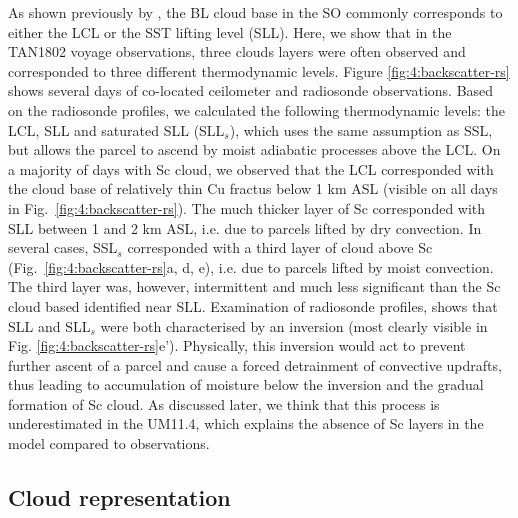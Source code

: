 As shown previously by \cite{kuma2020a}, the BL cloud base in the SO commonly
corresponds to either the LCL or the SST lifting level (SLL). Here, we show
that in the TAN1802 voyage observations, three clouds layers were often observed
and corresponded to three different thermodynamic levels. Figure
\ref{fig:4:backscatter-rs} shows several days of co-located ceilometer and
radiosonde observations. Based on the radiosonde profiles, we calculated the
following thermodynamic levels: the LCL, SLL and saturated SLL (SLL$_s$), which
uses the same assumption as SSL, but allows the parcel to ascend by moist
adiabatic processes above the LCL. On a majority of days with Sc cloud, we observed
that the LCL corresponded with the cloud base of relatively thin Cu fractus
below 1 km ASL (visible on all days in Fig.~\ref{fig:4:backscatter-rs}). The much thicker
layer of Sc corresponded with SLL between 1 and 2 km ASL, i.e. due to parcels lifted by dry convection.
In several cases, SSL$_s$ corresponded with a third layer of cloud above Sc
(Fig.~\ref{fig:4:backscatter-rs}a, d, e), i.e. due to parcels lifted by moist
convection. The third layer was, however, intermittent and much less significant
than the Sc cloud based identified near SLL. Examination of radiosonde profiles, shows that SLL and SLL$_s$ were both characterised by an inversion (most clearly visible in Fig.
\ref{fig:4:backscatter-rs}e'). Physically, this inversion would act to prevent
further ascent of a parcel and cause a forced detrainment of convective updrafts,
thus leading to accumulation of moisture below the inversion and the gradual
formation of Sc cloud. As discussed later, we think that this process is
underestimated in the UM11.4, which explains the absence of Sc layers in the model compared to observations.

\subsection{Cloud representation}
\label{sec:4:cloud-representation}

